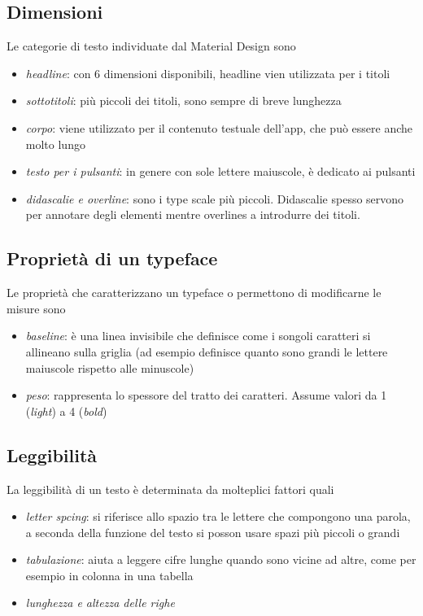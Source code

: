 \documentclass[12pt, a4paper]{report}
\begin{document}
		\subsection{Dimensioni}
		Le categorie di testo individuate dal Material Design sono
		\begin{itemize}
			\item \textit{headline}: con 6 dimensioni disponibili, headline vien utilizzata per i titoli
			\item \textit{sottotitoli}: più piccoli dei titoli, sono sempre di breve lunghezza
			\item \textit{corpo}: viene utilizzato per il contenuto testuale dell'app, che può essere anche molto lungo
			\item \textit{testo per i pulsanti}: in genere con sole lettere maiuscole, è dedicato ai pulsanti
			\item \textit{didascalie e overline}: sono i type scale più piccoli. Didascalie spesso servono per annotare degli elementi mentre overlines a introdurre dei titoli.
		\end{itemize}

	\subsection{Proprietà di un typeface}
		Le proprietà che caratterizzano un typeface o permettono di modificarne le misure sono
		\begin{itemize}
			\item \textit{baseline}: è una linea invisibile che definisce come i songoli caratteri si allineano sulla griglia (ad esempio definisce quanto sono grandi le lettere maiuscole rispetto alle minuscole)
			\item \textit{peso}: rappresenta lo spessore del tratto dei caratteri. Assume valori da 1 (\textit{light}) a 4 (\textit{bold})
		\end{itemize}

	\subsection{Leggibilità}
	La leggibilità di un testo è determinata da molteplici fattori quali
	\begin{itemize}
		\item \textit{letter spcing}: si riferisce allo spazio tra le lettere che compongono una parola, a seconda della funzione del testo si posson usare spazi più piccoli o grandi
		\item \textit{tabulazione}: aiuta a leggere cifre lunghe quando sono vicine ad altre, come per esempio in colonna in una tabella
		\item \textit{lunghezza e altezza delle righe}
	\end{itemize}
\end{document}
